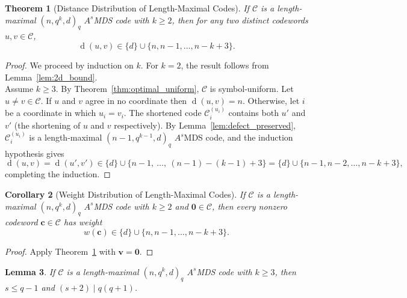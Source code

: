 \documentclass[12pt, letterpaper]{article}
\theoremstyle{plain}
\newtheorem{theorem}{Theorem}[section]
\newtheorem{lemma}[theorem]{Lemma}
\newtheorem{corollary}[theorem]{Corollary}
\theoremstyle{definition}
\newcommand{\dist}{\operatorname{d}}
\begin{document}
	\begin{theorem}[Distance Distribution of Length-Maximal Codes]
		\label{thm:optimal_weights}
		If $\mathcal{C}$ is a length-maximal $(n, q^k, d)_q$ $A^s$MDS code with $k \ge 2$, then for any two distinct codewords $u, v \in \mathcal{C}$,
		\[
		\dist(u,v) \in \{d\} \cup \{n, n-1, \ldots, n-k+3\}.
		\]
	\end{theorem}
	
	\begin{proof}
		We proceed by induction on $k$. For $k=2$, the result follows from Lemma~\ref{lem:2d_bound}.\\
		Assume $k \ge 3$. By Theorem~\ref{thm:optimal_uniform}, $\mathcal{C}$ is symbol-uniform. Let $u\ne v \in \mathcal{C}$. If $u$ and
		$v$ agree in no coordinate then $\dist(u,v) = n$. Otherwise, let $i$ be a coordinate in which $u_i = v_i$. The shortened code $
		\mathcal{C}_i^{(u_i)}$ contains both $u'$ and $v'$ (the shortening of $u$ and $v$ respectively). By 	Lemma~\ref{lem:defect_preserved}, $\mathcal{C}_i^{(u_i)}$ is a length-maximal $(n-1, q^{k-1}, d)_q$ $A^s$MDS code, and the induction hypothesis gives \[	\dist(u,v) = \dist(u',v') \in  \{d\} \cup \{n-1,\ \ldots,\ (n-1)-(k-1)+3\} = \{d\} \cup \{n-1, n-2, \ldots, n-k+3\},\]
		completing the induction.
	\end{proof}
	
	\begin{corollary}[Weight Distribution of Length-Maximal Codes]
		\label{cor:distance_distribution}
		If $\mathcal{C}$ is a length-maximal $(n, q^k, d)_q$ $A^s$MDS code with $k \ge 2$ and $\mathbf{0} \in \mathcal{C}$, then every nonzero codeword $\mathbf{c} \in \mathcal{C}$ has weight
		\[
		w(\mathbf{c}) \in \{d\} \cup \{n, n-1, \ldots, n-k+3\}.
		\]
	\end{corollary}

	\begin{proof}
		Apply Theorem~\ref{thm:optimal_weights} with $\mathbf{v} = \mathbf{0}$.
	\end{proof}

	\begin{lemma}\label{lem:divisibility}
		If $\mathcal{C}$ is a length-maximal $(n, q^k, d)_q$ $A^s$MDS code with $k \ge 3$, then $s \le q-1$ and $(s+2) \mid q(q+1)$.
	\end{lemma}
	
\end{document}
